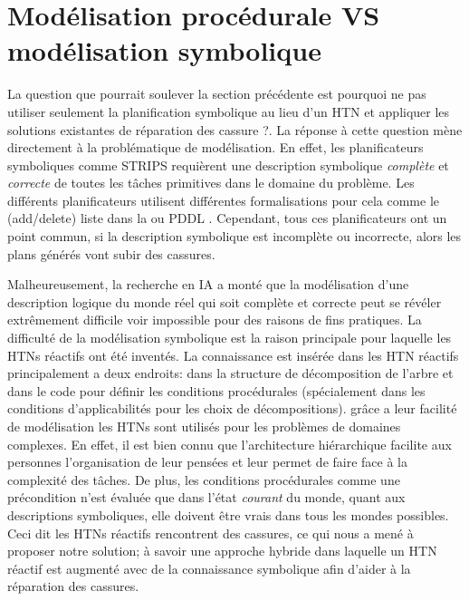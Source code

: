 \documentclass[a4paper,twoside,french]{article}
\begin{document}
		\section {Modélisation procédurale VS modélisation symbolique}
		La question que pourrait soulever la section précédente est pourquoi ne pas utiliser seulement la planification symbolique au lieu d'un HTN et appliquer les solutions existantes de réparation des cassure ?. La réponse à cette question mène directement à la problématique de modélisation. En effet, les planificateurs symboliques comme STRIPS requièrent une description  symbolique {\em complète} et {\em correcte} de toutes les tâches primitives dans le domaine du problème. Les différents planificateurs utilisent différentes formalisations pour cela comme le (add/delete) liste dans la  ou PDDL \cite{ghallab1998pddl}. Cependant, tous ces planificateurs ont un point  commun, si la description symbolique est incomplète ou incorrecte, alors les plans générés vont subir des cassures. 
		\par Malheureusement, la recherche en IA a monté que la modélisation d'une description logique du monde réel qui soit complète et correcte  peut se révéler extrêmement difficile voir impossible  pour des raisons de fins pratiques.  La difficulté de la modélisation symbolique est la raison principale pour laquelle les HTNs réactifs ont été inventés. La connaissance est insérée dans les HTN réactifs principalement a deux endroits: dans la structure de décomposition de l'arbre et dans le code pour définir les conditions procédurales (spécialement dans les conditions d'applicabilités pour les choix de décompositions). grâce a leur facilité de modélisation les HTNs sont utilisés pour les  problèmes de domaines complexes. En effet, il est bien connu que l'architecture hiérarchique facilite aux personnes l'organisation de leur pensées et leur permet de faire face à la complexité des tâches. De plus, les conditions procédurales comme une précondition n'est évaluée que dans l'état {\em courant} du monde, quant aux descriptions symboliques, elle doivent être vrais dans tous les mondes possibles. Ceci dit les HTNs réactifs rencontrent des cassures, ce qui nous a mené à proposer notre solution; à savoir une approche hybride dans laquelle un HTN réactif est augmenté avec de la connaissance symbolique afin d'aider à la réparation des cassures. 
		
\end{document}
